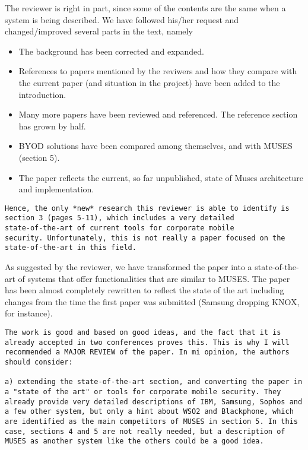 \documentclass[preprint]{elsarticle}
\begin{document}
{\begin{verbatim}
\end{verbatim}

The reviewer is right in part, since some of the contents are the same when a system is being described.
We have followed his/her request and changed/improved several parts in
the text, namely  \begin{itemize}
\item The background has been corrected and expanded.
\item References to papers mentioned by the reviwers and how they
  compare with the current paper (and situation in the project) have
  been added to the introduction.
\item Many more papers have been reviewed and referenced. The
  reference section has grown by half.
\item BYOD solutions have been compared among themselves, and with
  MUSES (section 5).
\item The paper reflects the current, so far unpublished, state of
  Muses architecture and implementation. 
\end{itemize}

\begin{verbatim}
Hence, the only *new* research this reviewer is able to identify is
section 3 (pages 5-11), which includes a very detailed
state-of-the-art of current tools for corporate mobile
security. Unfortunately, this is not really a paper focused on the
state-of-the-art in this field.
\end{verbatim}

As suggested by the reviewer, we have transformed the paper into a
state-of-the-art of systems that offer functionalities that are
similar to MUSES. The paper has been
almost completely rewritten to reflect the state of the art including
changes from the time the first paper was submitted (Samsung dropping
KNOX, for instance). 


\begin{verbatim}
The work is good and based on good ideas, and the fact that it is
already accepted in two conferences proves this. This is why I will
recommended a MAJOR REVIEW of the paper. In mi opinion, the authors
should consider: 

a) extending the state-of-the-art section, and converting the paper in
a "state of the art" or tools for corporate mobile security. They
already provide very detailed descriptions of IBM, Samsung, Sophos and
a few other system, but only a hint about WSO2 and Blackphone, which
are identified as the main competitors of MUSES in section 5. In this
case, sections 4 and 5 are not really needed, but a description of
MUSES as another system like the others could be a good idea. 
\end{verbatim}

}
\end{document}
